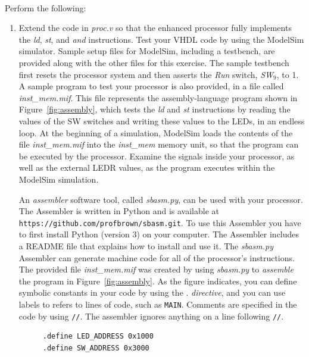\documentclass[epsfig,10pt,fullpage]{article}
\begin{document}
~\\
\noindent
Perform the following:
\begin{enumerate}
\item Extend the code in {\it proc.v} so that the enhanced processor fully implements the 
{\it ld}, {\it st}, and {\it and} instructions. Test your VHDL code by using the ModelSim
simulator. Sample setup files for ModelSim, including a testbench, are provided along with 
the other files for this exercise.  The sample testbench first resets the processor system
and then asserts the {\it Run} switch, {\it SW}$_9$, to 1. A sample program to test your 
processor is also provided, in a file called {\it inst\_mem.mif}. This file represents the 
assembly-language program shown in Figure~\ref{fig:assembly}, which tests 
the {\it ld} and {\it st} instructions by reading the values of the SW switches and writing 
these values to the LEDs, in an endless loop. At the beginning of a simulation, ModelSim loads 
the contents of the file {\it inst\_mem.mif} into the {\it inst\_mem} memory unit, so
that the program can be executed by the processor.  Examine the signals inside 
your processor, as well as the external LEDR values, as the program executes within the
ModelSim simulation.

An {\it assembler} software tool, called {\it sbasm.py}, can be used with your processor.
The Assembler is written in Python and is available at
\texttt{https://github.com/profbrown/sbasm.git}. To use this 
Assembler you have to first install Python (version 3) on your computer. The Assembler includes
a README file that explains how to install and use it. The {\it sbasm.py} Assembler can 
generate machine code for all of the processor's instructions. The provided file 
{\it inst\_mem.mif} was created by using {\it sbasm.py} to {\it assemble} the program in 
Figure~\ref{fig:assembly}. As the figure indicates, you can define symbolic
constants in your code by using the . {\it directive}, and you can use 
labels to refers to lines of code, such as \texttt{MAIN}.
Comments are specified in the code by using \texttt{//}. The assembler ignores anything 
on a line following \texttt{//}.

\lstset{language=ASM,numbers=none,escapechar=|}
\begin{figure}[H]
\begin{center}
\begin{minipage}[h]{12.5 cm}
\begin{lstlisting}[name=proc]
.define LED_ADDRESS 0x1000
.define SW_ADDRESS 0x3000


\end{lstlisting}
\end{minipage}
\end{center}
\end{figure}
\end{enumerate}
\end{document}
